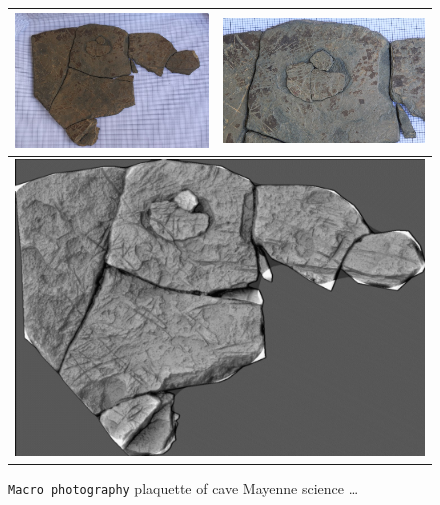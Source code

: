 \begin{figure}
\begin{tabular}{||c|c||}
   \hline \hline 
   \includegraphics[width=72mm]{FIGS/SAMPLES/Doc-Pijo1.jpg}&
   \includegraphics[width=75mm]{FIGS/SAMPLES/Doc-Pijo2.jpg} \\ \hline  \hline 
    \multicolumn{2}{|c|}{\includegraphics[width=150mm]{FIGS/SAMPLES/Doc-Pijo3.jpg}}  \\ \hline  \hline
\end{tabular}
\caption{{\tt Macro photography} plaquette of cave Mayenne science \dots}
\end{figure}











